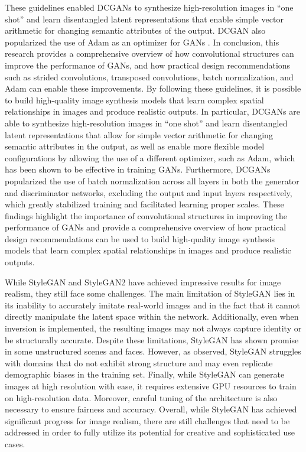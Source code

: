 These guidelines enabled DCGANs to synthesize high-resolution images in ``one shot'' and learn disentangled latent representations that enable simple vector arithmetic for changing semantic attributes of the output. DCGAN also popularized the use of Adam as an optimizer for GANs \citep{goodfellow2017nips2016tutorialgenerative}. In conclusion, this research provides a comprehensive overview of how convolutional structures can improve the performance of GANs, and how practical design recommendations such as strided convolutions, transposed convolutions, batch normalization, and Adam can enable these improvements. By following these guidelines, it is possible to build high-quality image synthesis models that learn complex spatial relationships in images and produce realistic outputs. In particular, DCGANs are able to synthesize high-resolution images in ``one shot'' and learn disentangled latent representations that allow for simple vector arithmetic for changing semantic attributes in the output, as well as enable more flexible model configurations by allowing the use of a different optimizer, such as Adam, which has been shown to be effective in training GANs. Furthermore, DCGANs popularized the use of batch normalization across all layers in both the generator and discriminator networks, excluding the output and input layers respectively, which greatly stabilized training and facilitated learning proper scales. These findings highlight the importance of convolutional structures in improving the performance of GANs and provide a comprehensive overview of how practical design recommendations can be used to build high-quality image synthesis models that learn complex spatial relationships in images and produce realistic outputs.

While StyleGAN and StyleGAN2 have achieved impressive results for image realism, they still face some challenges. The main limitation of StyleGAN lies in its inability to accurately imitate real-world images and in the fact that it cannot directly manipulate the latent space within the network. Additionally, even when inversion is implemented, the resulting images may not always capture identity or be structurally accurate. Despite these limitations, StyleGAN has shown promise in some unstructured scenes and faces. However, as \citet{bermano2022stateoftheartarchitecturemethodsapplications} observed, StyleGAN struggles with domains that do not exhibit strong structure and may even replicate demographic biases in the training set. Finally, while StyleGAN can generate images at high resolution with ease, it requires extensive GPU resources to train on high-resolution data. Moreover, careful tuning of the architecture is also necessary to ensure fairness and accuracy. Overall, while StyleGAN has achieved significant progress for image realism, there are still challenges that need to be addressed in order to fully utilize its potential for creative and sophisticated use cases.

